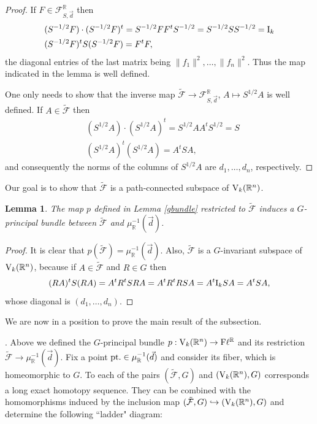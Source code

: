 \documentclass[12pt]{amsart}
\newtheorem{lem}[thm]{Lemma}
\theoremstyle{definition}
\theoremstyle{remark}
\newcommand{\RR}{\mathbb R}
\begin{document}
\begin{proof} If $F\in {\mathcal F}_{S, \vec{d}}^\RR$ then 
\begin{align*}
{}& (S^{-1/2}F)\cdot (S^{-1/2}F)^t= S^{-1/2}FF^tS^{-1/2}=S^{-1/2}SS^{-1/2}={\rm I}_k\\
{}& (S^{-1/2}F)^t S (S^{-1/2}F)=F^tF,
\end{align*}
the diagonal entries of the last matrix being $\|f_1\|^2, \ldots, \|f_n\|^2$. Thus the map indicated in the lemma is well defined.

One only needs to show that the inverse map $\tilde{\mathcal F} \to{\mathcal F}_{S, \vec{d}}^\RR$, $A\mapsto S^{1/2}A$ is well defined. 
If $A\in \tilde{\mathcal F}$ then
\begin{align*}
{}& (S^{1/2}A)\cdot (S^{1/2}A)^t= S^{1/2}AA^tS^{1/2}=S\\
{}& (S^{1/2}A)^t (S^{1/2}A)=A^tSA,
\end{align*}
and consequently the norms of the columns of $S^{1/2}A$  are $d_1, \ldots, d_n$, respectively. 
\end{proof} 
Our goal is to show that $\tilde{\mathcal F}$ is a path-connected subspace of ${\rm V}_k(\RR^n)$. 


\begin{lem} \label{princbun} The map $p$ defined in Lemma \ref{gbundle} restricted to $\tilde{\mathcal F}$ induces a $G$-principal bundle between $\tilde{\mathcal F}$ and 
$\mu_\RR^{-1}(\vec{d})$.
\end{lem}

\begin{proof}
It is clear that $p(\tilde{\mathcal F})= \mu_\RR^{-1}(\vec{d})$. Also, $\tilde{\mathcal F}$ is a $G$-invariant subspace of ${\rm V}_k(\RR^n)$, because if $A\in \tilde{\mathcal F}$ and $R\in G$ then
$$(RA)^tS(RA)=A^tR^tSRA=A^tR^tRSA=A^t{\rm I}_kSA=A^tSA,$$
whose diagonal is $(d_1,\ldots, d_n)$. 
\end{proof}
 
 We are now in a position to prove the main result of the subsection.
 
 . Above we defined the $G$-principal bundle $p:{\rm V}_k(\RR^n) \to {\rm F}\ell^\RR$ and its restriction 
 $\tilde{\mathcal F} \to \mu_\RR^{-1}(\vec{d})$. Fix a point ${\rm pt.}\in \mu_\RR^{-1}(\vec{d})$ and consider its fiber, which is homeomorphic to $G$. To each of the pairs $(\tilde{\mathcal F}, G)$ and $({\rm V}_k(\RR^n), G)$ corresponds a long exact homotopy sequence. They can be combined with the homomorphisms induced by the inclusion map
 $(\tilde{\mathcal F}, G)\hookrightarrow ({\rm V}_k(\RR^n), G)$ and determine the following ``ladder" diagram:
\end{document}
